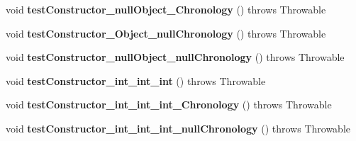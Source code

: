 \begin{DoxyCompactItemize}
\item 
\hypertarget{classorg_1_1joda_1_1time_1_1_test_local_date___constructors_aca7a1f811f4544bf62ffebb886cbf7f7}{void {\bfseries test\-Constructor\-\_\-null\-Object\-\_\-\-Chronology} ()  throws Throwable }\label{classorg_1_1joda_1_1time_1_1_test_local_date___constructors_aca7a1f811f4544bf62ffebb886cbf7f7}

\item 
\hypertarget{classorg_1_1joda_1_1time_1_1_test_local_date___constructors_a08e381fbbd45136177d15155eca39468}{void {\bfseries test\-Constructor\-\_\-\-Object\-\_\-null\-Chronology} ()  throws Throwable }\label{classorg_1_1joda_1_1time_1_1_test_local_date___constructors_a08e381fbbd45136177d15155eca39468}

\item 
\hypertarget{classorg_1_1joda_1_1time_1_1_test_local_date___constructors_aaf46ed48983ef893c49abbe68b81894f}{void {\bfseries test\-Constructor\-\_\-null\-Object\-\_\-null\-Chronology} ()  throws Throwable }\label{classorg_1_1joda_1_1time_1_1_test_local_date___constructors_aaf46ed48983ef893c49abbe68b81894f}

\item 
\hypertarget{classorg_1_1joda_1_1time_1_1_test_local_date___constructors_a75bbfd5723b309d2bb32812b59a04512}{void {\bfseries test\-Constructor\-\_\-int\-\_\-int\-\_\-int} ()  throws Throwable }\label{classorg_1_1joda_1_1time_1_1_test_local_date___constructors_a75bbfd5723b309d2bb32812b59a04512}

\item 
\hypertarget{classorg_1_1joda_1_1time_1_1_test_local_date___constructors_a9e2abd27dccac5590ceecfa6861101b9}{void {\bfseries test\-Constructor\-\_\-int\-\_\-int\-\_\-int\-\_\-\-Chronology} ()  throws Throwable }\label{classorg_1_1joda_1_1time_1_1_test_local_date___constructors_a9e2abd27dccac5590ceecfa6861101b9}

\item 
\hypertarget{classorg_1_1joda_1_1time_1_1_test_local_date___constructors_a652763dfdd2221de8987eea87abf878f}{void {\bfseries test\-Constructor\-\_\-int\-\_\-int\-\_\-int\-\_\-null\-Chronology} ()  throws Throwable }\label{classorg_1_1joda_1_1time_1_1_test_local_date___constructors_a652763dfdd2221de8987eea87abf878f}

\end{DoxyCompactItemize}
